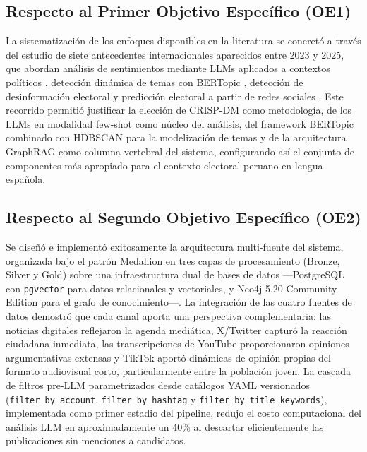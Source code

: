 \subsection*{Respecto al Primer Objetivo Específico (OE1)}
La sistematización de los enfoques disponibles en la literatura se concretó a
través del estudio de siete antecedentes internacionales aparecidos entre 2023 y
2025, que abordan análisis de sentimientos mediante LLMs aplicados a contextos
políticos \parencite{pr_alvarez2023llm_political, pr_gujral2024llm_elections},
detección dinámica de temas con BERTopic
\parencite{pr_mendonca2025bertopic_political, pr_janssens2025bertopic_llm,
pr_islam2025latent_topic}, detección de desinformación electoral
\parencite{pr_chen2024combating_misinformation} y predicción electoral a partir
de redes sociales \parencite{pr_alvi2023twitter_election_review}. Este recorrido
permitió justificar la elección de CRISP-DM como metodología, de los LLMs en
modalidad few-shot como núcleo del análisis, del framework BERTopic combinado
con HDBSCAN para la modelización de temas y de la arquitectura GraphRAG como
columna vertebral del sistema, configurando así el conjunto de componentes más
apropiado para el contexto electoral peruano en lengua española.
\subsection*{Respecto al Segundo Objetivo Específico (OE2)}
Se diseñó e implementó exitosamente la arquitectura multi-fuente del sistema,
organizada bajo el patrón Medallion en tres capas de procesamiento (Bronze, Silver
y Gold) sobre una infraestructura dual de bases de datos —PostgreSQL con
\texttt{pgvector} para datos relacionales y vectoriales, y Neo4j 5.20 Community
Edition para el grafo de conocimiento—. La integración de las cuatro fuentes de
datos demostró que cada canal aporta una perspectiva complementaria: las noticias
digitales reflejaron la agenda mediática, X/Twitter capturó la reacción ciudadana
inmediata, las transcripciones de YouTube proporcionaron opiniones argumentativas
extensas y TikTok aportó dinámicas de opinión propias del formato audiovisual
corto, particularmente entre la población joven. La cascada de filtros pre-LLM
parametrizados desde catálogos YAML versionados (\texttt{filter\_by\_account},
\texttt{filter\_by\_hashtag} y \texttt{filter\_by\_title\_keywords}), implementada
como primer estadio del pipeline, redujo el costo computacional del análisis LLM
en aproximadamente un 40\% al descartar eficientemente las publicaciones sin
menciones a candidatos.

